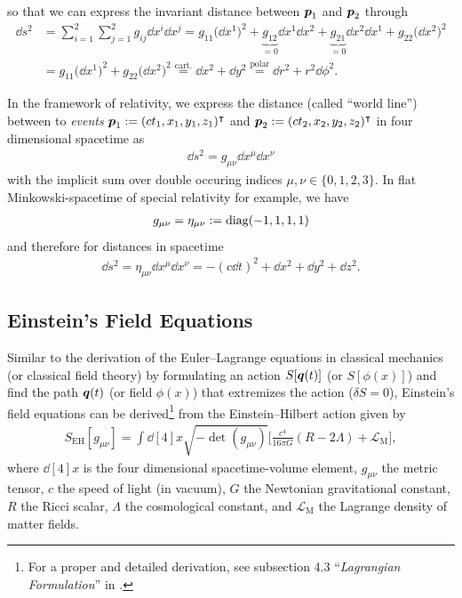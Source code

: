so that we can express the invariant distance between $\vb*{p}_{1}$ and $\vb*{p}_{2}$ through
\begin{align}
    \dd{s}^2 &= \sum_{i = 1}^{2} \sum_{j = 1}^{2} g_{ij}\dd{x}^{i}\dd{x}^{j} = g_{11} \bigl(\dd{x}^{1}\bigr)^2 + \underbrace{g_{12}}_{= 0} \dd{x}^{1}\dd{x}^{2} + \underbrace{g_{21}}_{= 0} \dd{x}^{2} \dd{x}^{1} + g_{22} \bigl(\dd{x}^{2} \bigr)^2 \\
             &= g_{11} \bigl(\dd{x}^{1}\bigr)^2 + g_{22} \bigl(\dd{x}^{2}\bigr)^2 \overset{\text{cart.}}{=} \dd{x}^{2} + \dd{y}^{2} \overset{\text{polar}}{=} \dd{r}^{2} + r^2 \dd{\phi}^{2}.  
\end{align}

\noindent In the framework of relativity, we express the distance (called ``world line'') between to \textit{events} $\vb*{p}_{1} := (c t_{1}, x_{1}, y_{1}, z_{1})^{\intercal}$ and $\vb*{p}_{2} := (c t_{2}, x_{2}, y_{2}, z_{2})^{\intercal}$ in four dimensional spacetime as
\begin{align}
    \dd{s}^2 = g_{\mu\nu} \dd{x}^{\mu} \dd{x}^{\nu}
\end{align}
with the implicit sum over double occuring indices $\mu, \nu \in \{0,1,2,3\}$. In flat Minkowski-spacetime of special relativity for example, we have 
\begin{align}
    g_{\mu\nu} = \eta_{\mu\nu} := \operatorname{diag}(-1, 1, 1, 1) 
\end{align} 
and therefore for distances in spacetime
\begin{align}
    \dd{s}^2 = \eta_{\mu\nu} \dd{x}^{\mu} \dd{x}^{\nu} = - (c \dd{t})^{2} + \dd{x}^{2} + \dd{y}^{2} + \dd{z}^{2}.    
\end{align}



\subsection{Einstein's Field Equations}

\noindent Similar to the derivation of the Euler--Lagrange equations in classical mechanics (or classical field theory) by formulating an action $S[\vb*{q}(t)]$ (or $S[\phi(x)]$) and find the path $\vb*{q}(t)$ (or field $\phi(x)$) that extremizes the action ($\delta S = 0$), Einstein's field equations can be derived\footnote{For a proper and detailed derivation, see subsection 4.3 ``\textit{Lagrangian Formulation}'' in \cite[p.~159]{SeanCarroll2019}.} from the Einstein--Hilbert action given by
\begin{align}
    S_{\text{EH}}[g_{\mu\nu}] = \int \dd[4]{x} \sqrt{-\det(g_{\mu\nu})} \biggl[\frac{c^4}{16\pi G}(R - 2\Lambda) + \mathcal{L}_{\text{M}} \biggr], 
\end{align}
where $\dd[4]{x}$ is the four dimensional spacetime-volume element, $g_{\mu\nu}$ the metric tensor, $c$ the speed of light (in vacuum), $G$ the Newtonian gravitational constant, $R$ the Ricci scalar, $\Lambda$ the cosmological constant, and $\mathcal{L}_{\text{M}}$ the Lagrange density of matter fields. 

